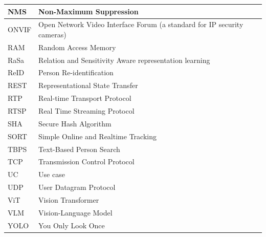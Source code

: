 \begin{longtable}{|p{3cm}|p{11cm}|}
\hline
NMS & Non-Maximum Suppression \\
\hline
ONVIF & Open Network Video Interface Forum (a standard for IP security cameras) \\
\hline
RAM & Random Access Memory \\
\hline
RaSa & Relation and Sensitivity Aware representation learning \\
\hline
ReID & Person Re-identification \\
\hline
REST & Representational State Transfer \\
\hline
RTP & Real-time Transport Protocol \\
\hline
RTSP & Real Time Streaming Protocol \\
\hline
SHA & Secure Hash Algorithm \\
\hline
SORT & Simple Online and Realtime Tracking \\
\hline
TBPS & Text-Based Person Search \\
\hline
TCP & Transmission Control Protocol \\
\hline
UC & Use case \\
\hline
UDP & User Datagram Protocol \\
\hline
ViT & Vision Transformer \\
\hline
VLM & Vision-Language Model \\
\hline
YOLO & You Only Look Once \\
\hline
\end{longtable}
